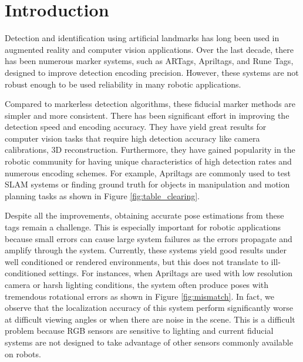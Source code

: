 \section{Introduction}
\label{sec:intro}
Detection and identification using artificial landmarks has long been used in augmented reality and computer vision applications. Over the last decade, there has been numerous marker systems, such as ARTags, Apriltags, and Rune Tags, designed to improve detection encoding precision. However, these systems are not robust enough to be used reliability in many robotic applications.

Compared to markerless detection algorithms, these fiducial marker methods are simpler and more consistent. There has been significant effort in improving the detection speed and encoding accuracy. They have yield great results for computer vision tasks that require high detection accuracy like camera calibrations, 3D reconstruction. Furthermore, they have gained popularity in the robotic community for having unique characteristics of high detection rates and numerous encoding schemes. For example, Apriltags are commonly used to test SLAM systems or finding ground truth for objects in manipulation and motion planning tasks as shown in Figure \ref{fig:table_clearing}. 

Despite all the improvements, obtaining accurate pose estimations from these tags remain a challenge. This is especially important for robotic applications because small errors can cause large system failures as the errors propagate and amplify through the system. Currently, these systems yield good results under well conditioned or rendered environments, but this does not translate to ill-conditioned settings. For instances, when Apriltags are used with low resolution camera or harsh lighting conditions, the system often produce poses with tremendous rotational errors as shown in Figure \ref{fig:mismatch}. In fact, we observe that the localization accuracy of this system perform significantly worse at difficult viewing angles or when there are noise in the scene. This is a difficult problem because RGB sensors are sensitive to lighting and current fiducial systems are not designed to take advantage of other sensors commonly available on robots.

